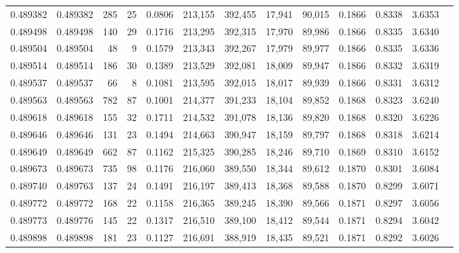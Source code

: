 \begin{tabular}{rrrrrrrrrrrrr}
0.489382 & 0.489382 &   285 &    25 &                                     0.0806 & 213,155 & 392,455 &  17,941 &  90,015 & 0.1866 & 0.8338 & 3.6353 \\
0.489498 & 0.489498 &   140 &    29 &                                     0.1716 & 213,295 & 392,315 &  17,970 &  89,986 & 0.1866 & 0.8335 & 3.6340 \\
0.489504 & 0.489504 &    48 &     9 &                                     0.1579 & 213,343 & 392,267 &  17,979 &  89,977 & 0.1866 & 0.8335 & 3.6336 \\
0.489514 & 0.489514 &   186 &    30 &                                     0.1389 & 213,529 & 392,081 &  18,009 &  89,947 & 0.1866 & 0.8332 & 3.6319 \\
0.489537 & 0.489537 &    66 &     8 &                                     0.1081 & 213,595 & 392,015 &  18,017 &  89,939 & 0.1866 & 0.8331 & 3.6312 \\
0.489563 & 0.489563 &   782 &    87 &                                     0.1001 & 214,377 & 391,233 &  18,104 &  89,852 & 0.1868 & 0.8323 & 3.6240 \\
0.489618 & 0.489618 &   155 &    32 &                                     0.1711 & 214,532 & 391,078 &  18,136 &  89,820 & 0.1868 & 0.8320 & 3.6226 \\
0.489646 & 0.489646 &   131 &    23 &                                     0.1494 & 214,663 & 390,947 &  18,159 &  89,797 & 0.1868 & 0.8318 & 3.6214 \\
0.489649 & 0.489649 &   662 &    87 &                                     0.1162 & 215,325 & 390,285 &  18,246 &  89,710 & 0.1869 & 0.8310 & 3.6152 \\
0.489673 & 0.489673 &   735 &    98 &                                     0.1176 & 216,060 & 389,550 &  18,344 &  89,612 & 0.1870 & 0.8301 & 3.6084 \\
0.489740 & 0.489763 &   137 &    24 &                                     0.1491 & 216,197 & 389,413 &  18,368 &  89,588 & 0.1870 & 0.8299 & 3.6071 \\
0.489772 & 0.489772 &   168 &    22 &                                     0.1158 & 216,365 & 389,245 &  18,390 &  89,566 & 0.1871 & 0.8297 & 3.6056 \\
0.489773 & 0.489776 &   145 &    22 &                                     0.1317 & 216,510 & 389,100 &  18,412 &  89,544 & 0.1871 & 0.8294 & 3.6042 \\
0.489898 & 0.489898 &   181 &    23 &                                     0.1127 & 216,691 & 388,919 &  18,435 &  89,521 & 0.1871 & 0.8292 & 3.6026 \\

\end{tabular}
